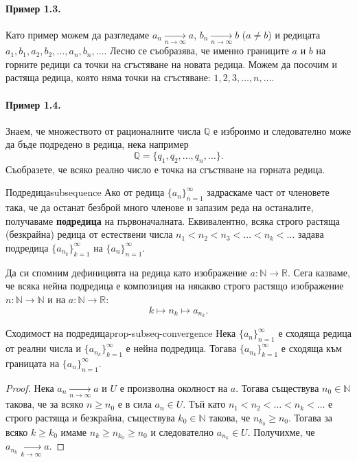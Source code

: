 \paragraph{Пример 1.3.}
Като пример можем да разгледаме $a_n \xrightarrow[n\to\infty]{} a$, $b_n \xrightarrow[n\to\infty]{} b$ ($a \ne b$) и редицата $a_1, b_1, a_2, b_2, \dots, a_n, b_n, \dots$. Лесно се съобразява, че именно границите $a$ и $b$ на горните редици са точки на сгъстяване на новата редица. Можем да посочим и растяща редица, която няма точки на сгъстяване: $1, 2, 3, \dots, n, \dots$.

\paragraph{Пример 1.4.}
Знаем, че множеството от рационалните числа $\mathbb{Q}$ е изброимо и следователно може да бъде подредено в редица, нека например
\[
\mathbb{Q} = \{q_1, q_2, \dots, q_n, \dots\}.
\]
Съобразете, че всяко реално число е точка на сгъстяване на горната редица.

\begin{definition}{Подредица}{subsequence}
Ако от редица $\{a_n\}_{n=1}^{\infty}$ задраскаме част от членовете така, че да останат безброй много членове и запазим реда на останалите, получаваме \textbf{подредица} на първоначалната. Еквивалентно, всяка строго растяща (безкрайна) редица от естествени числа $n_1 < n_2 < n_3 < \dots < n_k < \dots$ задава подредица $\{a_{n_k}\}_{k=1}^{\infty}$ на $\{a_n\}_{n=1}^{\infty}$.
\end{definition}

Да си спомним дефиницията на редица като изображение $a \colon \mathbb{N} \to \mathbb{R}$. Сега казваме, че всяка нейна подредица е композиция на някакво строго растящо изображение $n \colon \mathbb{N} \to \mathbb{N}$ и на $a \colon \mathbb{N} \to \mathbb{R}$:
\[
k \mapsto n_k \mapsto a_{n_k}.
\]

\begin{theorem}{Сходимост на подредица}{prop-subseq-convergence}
Нека $\{a_n\}_{n=1}^{\infty}$ е сходяща редица от реални числа и $\{a_{n_k}\}_{k=1}^{\infty}$ е нейна подредица. Тогава $\{a_{n_k}\}_{k=1}^{\infty}$ е сходяща към границата на $\{a_n\}_{n=1}^{\infty}$.
\end{theorem}

\begin{proof}
Нека $a_n \xrightarrow[n\to\infty]{} a$ и $U$ е произволна околност на $a$. Тогава съществува $n_0 \in \mathbb{N}$ такова, че за всяко $n \ge n_0$ е в сила $a_n \in U$. Тъй като $n_1 < n_2 < \dots < n_k < \dots$ е строго растяща и безкрайна, съществува $k_0 \in \mathbb{N}$ такова, че $n_{k_0} \ge n_0$. Тогава за всяко $k \ge k_0$ имаме $n_k \ge n_{k_0} \ge n_0$ и следователно $a_{n_k} \in U$. Получихме, че $a_{n_k} \xrightarrow[k\to\infty]{} a$.
\end{proof}

